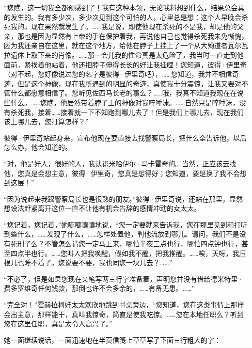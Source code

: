 \par “您瞧，这一切我全都预感到了！我有这种本领，无论我料想到什么，结果总会真的发生的。我有多少次，多少次见到这个可怕的人，心里总是想：这个人早晚会杀死我的。现在果然就发生了。……我是说，即使他现在杀死的不是我，却是他的父亲，那也是因为显然有上帝的手在保护着我，再说他自己也觉得杀死我未免惭愧，因为我还亲自在这里，就在这个地方，给他在脖子上挂上了一个从大殉道者瓦尔瓦拉遗体上取下来的肖像。……那一会儿我的性命真是太危险了，我当时一直走到他面前，紧挨着他站着，他还把脖子伸得长长的好让我挂哩！您知道，彼得·伊里奇（对不起，您好像说过您的名字是彼得·伊里奇吧），……您知道，我并不相信奇迹，但是这个神像，现在我所遇到的明显的奇迹，真使我十分震惊，让我又要对不管什么都愿意相信了。您听见佐西马长老的事么？……哦，我真不知道我现在在说些什么。……您瞧，他居然带着脖子上的神像对我啐唾沫。……自然只是啐唾沫，没有杀死我，接着……接着就一下不知跑到哪儿去了！但是我们上哪儿去，现在我们该上哪儿去，您打算怎样？”
\par 彼得·伊里奇站起身来，宣布他现在要直接去找警察局长，把什么全告诉他，以后怎么办，他会知道的。
\par “对，他是好人，很好的人，我认识米哈伊尔·马卡雷奇的。当然，正应该去找他，您真是会想主意，彼得·伊里奇，您真是想得好；您知道，要是换了我不会想到这层！”
\par “因为说起来我跟警察局长也是很熟的朋友。”彼得·伊里奇说，还站在那里，显然想设法赶紧离开这位一直不让他有机会告辞的感情冲动的女太太。
\par “您记着，您记着，”她嘟嘟囔囔地说，“您一定要就来告诉我，您在那里见到和打听到些什么，……发现了什么，……怎样处置他，判他流放到哪儿。请问，我们不是没有死刑了么？不管怎么请您一定马上来，哪怕半夜三点也行，哪怕四点钟也行，甚至四点半也行。……您叫人把我唤醒，假如我不醒，把我推醒。……唉，天呀，我压根儿也睡不着了。您说要不要，我也同您一块儿去？……”
\par “不必了，但是如果您现在亲笔写两三行字准备着，声明您并没有借给德米特里·费多罗维奇任何钱款，那倒也许不会多余的，……有备无患。……”
\par “完全对！”霍赫拉柯娃太太欢欣地跳到书桌旁边，“您知道，您在这类事情上那样会出主意，那样能干，真叫我惊奇，简直是使我吃惊。……您在本地任职么？听到您在这里任职，真是太令人高兴了。”
\par 她一面继续说话，一面迅速地在半页信笺上草草写了下面三行粗大的字：
